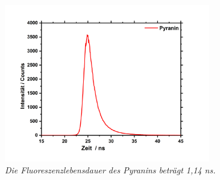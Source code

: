 \documentclass[12pt,a4paper]{report}
\begin{document}
			\begin{figure}[h!]
				\centering
				\includegraphics*[width=0.8\textwidth]{FLDPyranin.jpg}
				\caption{\textnormal{\textit{Die Fluoreszenzlebensdauer des Pyranins beträgt 1,14 ns.}}}
				\label{fig:FLDPyranin}
			\end{figure}\\
	\newpage
\end{document}
